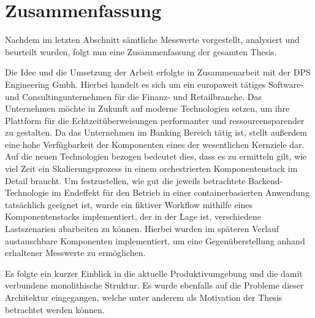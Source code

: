 \chapter{Zusammenfassung}

Nachdem im letzten Abschnitt sämtliche Messwerte vorgestellt, analysiert und beurteilt wurden, folgt nun eine Zusammenfassung der gesamten Thesis.

Die Idee und die Umsetzung der Arbeit erfolgte in Zusammenarbeit mit der DPS Engineering
Gmbh. Hierbei handelt es sich um ein europaweit tätiges Software- und Consultingunternehmen für
die Finanz- und Retailbranche. Das Unternehmen möchte in Zukunft auf moderne Technologien setzen, um ihre Plattform für die Echtzeitüberweisungen performanter und ressourcensparender zu gestalten. Da das Unternehmen im Banking Bereich tätig ist, stellt außerdem eine hohe Verfügbarkeit der Komponenten
eines der wesentlichen Kernziele dar. Auf die neuen Technologien bezogen bedeutet dies, dass es zu
ermitteln gilt, wie viel Zeit ein Skalierungsprozess in einem orchestrierten Komponentenstack im
Detail braucht. Um festzustellen, wie gut die jeweils betrachtete Backend-Technologie im Endeffekt für den Betrieb in einer containerbasierten Anwendung tatsächlich geeignet ist, wurde ein fiktiver Workflow mithilfe eines Komponentenstacks implementiert, der in der Lage ist, verschiedene Lastszenarien abarbeiten zu können. Hierbei wurden im späteren Verlauf austauschbare Komponenten implementiert, um eine Gegenüberstellung anhand erhaltener Messwerte zu ermöglichen.

Es folgte ein kurzer Einblick in die aktuelle Produktivumgebung und die damit verbundene monolithische Struktur. Es wurde ebenfalls auf die Probleme dieser Architektur eingegangen, welche unter anderem als Motivation der Thesis betrachtet werden können.

